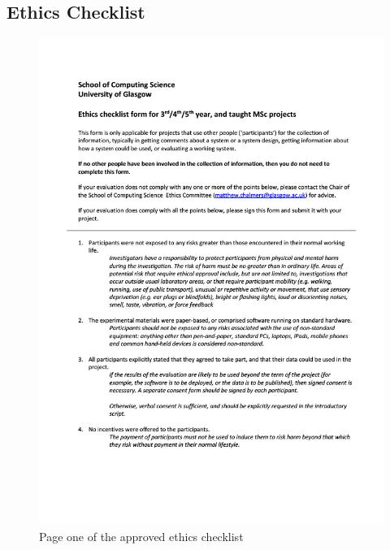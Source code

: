 \documentclass{l4proj}
\begin{document}
\begin{appendices}
\chapter{Ethics Checklist}
\label{appendix:ethics}

\begin{figure}[H]
\centering
    \includegraphics[width=0.95\linewidth]{images/Zsolt Takacs 2472886T Ethics Checklist1024_1.jpg}
    \caption{Page one of the approved ethics checklist}
    \label{fig:ethics_1} 
\end{figure}


\end{appendices}
\end{document}
